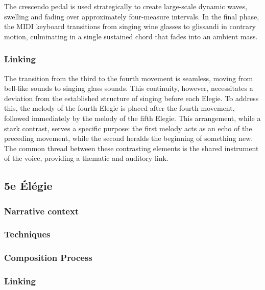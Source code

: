 \documentclass[12pt,twoside,maitrise]{dms}
\theoremstyle{definition}
\begin{document}
The crescendo pedal is used strategically to create large-scale dynamic waves, swelling and fading over approximately four-measure intervals.
In the final phase, the MIDI keyboard transitions from singing wine glasses to glissandi in contrary motion, culminating in a single sustained chord that fades into an ambient mass.


\subsubsection{Linking}

The transition from the third to the fourth movement is seamless, moving from bell-like sounds to singing glass sounds.
This continuity, however, necessitates a deviation from the established structure of singing before each Elegie.
To address this, the melody of the fourth Elegie is placed after the fourth movement, followed immediately by the melody of the fifth Elegie.
This arrangement, while a stark contrast, serves a specific purpose: the first melody acts as an echo of the preceding movement, while the second heralds the beginning of something new.
The common thread between these contrasting elements is the shared instrument of the voice, providing a thematic and auditory link.

\subsection{5e Élégie}

\subsubsection{Narrative context}

\subsubsection{Techniques}

\subsubsection{Composition Process}

\subsubsection{Linking}
\end{document}
